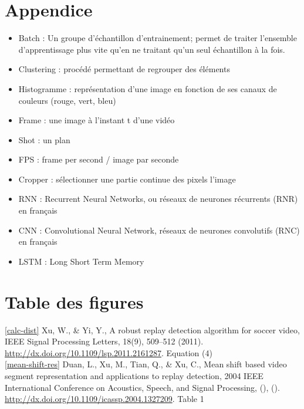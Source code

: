 \documentclass[11pt]{article}
\begin{document}
\section{Appendice}
\label{sec:orga2d5ad9}
\begin{itemize}
\item Batch : Un groupe d'échantillon d'entrainement; permet de traiter l'ensemble d'apprentissage plus vite qu'en ne traitant qu'un seul échantillon à la fois.\\
\item Clustering : procédé permettant de regrouper des éléments\\
\item Histogramme : représentation d'une image en fonction de ses canaux de couleurs (rouge, vert, bleu)\\
\item Frame : une image à l'instant t d'une vidéo\\
\item Shot : un plan\\
\item FPS : frame per second / image par seconde\\
\item Cropper : sélectionner une partie continue des pixels l'image\\
\item RNN : Recurrent Neural Networks, ou réseaux de neurones récurrents (RNR) en français\\
\item CNN : Convolutional Neural Network, réseaux de neurones convolutifs (RNC) en français\\
\item LSTM : Long Short Term Memory\\
\end{itemize}

\newpage
\section{Table des figures}
\label{sec:orgebac365}
\ref{calc-dist} Xu, W., \& Yi, Y., A robust replay detection algorithm for soccer video, IEEE Signal Processing Letters, 18(9), 509–512 (2011).  \url{http://dx.doi.org/10.1109/lsp.2011.2161287}. Equation (4)\\

\ref{mean-shift-res} Duan, L., Xu, M., Tian, Q., \& Xu, C., Mean shift based video segment representation and applications to replay detection, 2004 IEEE International Conference on Acoustics, Speech, and Signal Processing, (),  ().  \url{http://dx.doi.org/10.1109/icassp.2004.1327209}. Table 1\\
\end{document}
